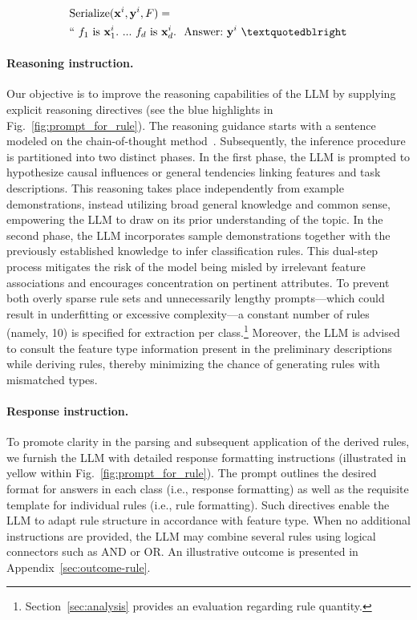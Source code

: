 \begin{align}
&\text{Serialize}(\mathbf{x}^i,\mathbf{y}^i, F) = \nonumber \\ 
&``\ f_1\ \text{is}\ \mathbf{x}^i_1.\ ... \ f_d\  \text{is}\  \mathbf{x}^i_d.\ \ \text{Answer:}\  \mathbf{y}^i\ ”
\end{align}

\vspace*{-0.12in}
\paragraph{Reasoning instruction.} Our objective is to improve the reasoning capabilities of the LLM by supplying explicit reasoning directives (see the blue highlights in Fig.~\ref{fig:prompt_for_rule}). The reasoning guidance starts with a sentence modeled on the chain-of-thought method~\cite{wei2022chain}. Subsequently, the inference procedure is partitioned into two distinct phases. In the first phase, the LLM is prompted to hypothesize causal influences or general tendencies linking features and task descriptions. This reasoning takes place independently from example demonstrations, instead utilizing broad general knowledge and common sense, empowering the LLM to draw on its prior understanding of the topic. In the second phase, the LLM incorporates sample demonstrations together with the previously established knowledge to infer classification rules. This dual-step process mitigates the risk of the model being misled by irrelevant feature associations and encourages concentration on pertinent attributes. To prevent both overly sparse rule sets and unnecessarily lengthy prompts—which could result in underfitting or excessive complexity—a constant number of rules (namely, 10) is specified for extraction per class.\footnote{Section~\ref{sec:analysis} provides an evaluation regarding rule quantity.} Moreover, the LLM is advised to consult the feature type information present in the preliminary descriptions while deriving rules, thereby minimizing the chance of generating rules with mismatched types.

\vspace*{-0.12in}
\paragraph{Response instruction.} To promote clarity in the parsing and subsequent application of the derived rules, we furnish the LLM with detailed response formatting instructions (illustrated in yellow within Fig.~\ref{fig:prompt_for_rule}). The prompt outlines the desired format for answers in each class (i.e., response formatting) as well as the requisite template for individual rules (i.e., rule formatting). Such directives enable the LLM to adapt rule structure in accordance with feature type. When no additional instructions are provided, the LLM may combine several rules using logical connectors such as AND or OR. An illustrative outcome is presented in Appendix~\ref{sec:outcome-rule}.

